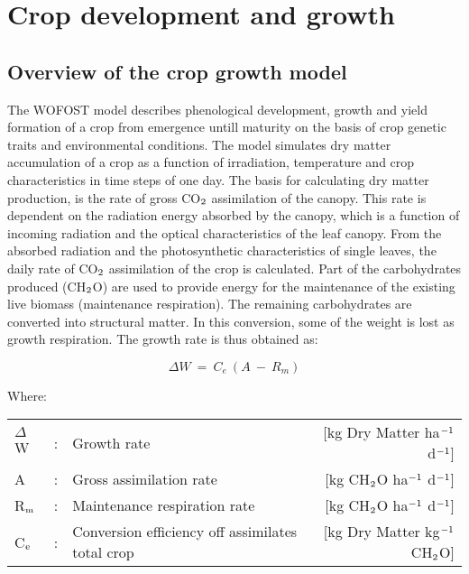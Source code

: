 \chapter{Crop development and growth}

\section{Overview of the crop growth model}

The WOFOST model describes phenological development, growth and yield formation of
a crop from emergence untill maturity on the basis of crop genetic traits and 
environmental conditions. The model simulates dry matter accumulation of a crop as a function
of irradiation, temperature and crop characteristics in time steps of one day. 
The basis for calculating dry matter production, is the rate of gross CO$_{{\rm 2}}$ assimilation of
the canopy. This rate is dependent on the radiation energy absorbed by the canopy, which
is a function of incoming radiation and the optical characteristics of the leaf canopy.
From the absorbed radiation and
the photosynthetic characteristics of single leaves, the daily rate of CO$_{{\rm 2}}$ assimilation of the
crop is calculated. Part of the carbohydrates produced (CH$_{{\rm 2}}$O) are used to provide energy
for the maintenance of the existing live biomass (maintenance respiration). The remaining
carbohydrates are converted into structural matter. In this conversion, some of the weight
is lost as growth respiration. The growth rate is thus obtained as:

\begin{equation}
\Delta W ~=~ C _{e} ~( A ~-~ R _{m} )
\end{equation}

Where:\\[5pt]
\begin{tabularx}{\textwidth}{llXr}
	$\Delta$W &:& Growth rate    &   
	[kg Dry Matter ha$^{{\rm -1}}$ d$^{{\rm -1}}$]\\
	A  &:& Gross assimilation   rate &  
	[kg CH$_{{\rm 2}}$O ha$^{{\rm -1}}$ d$^{{\rm -1}}$]\\
	R$_{{\rm m}}$  &:& Maintenance respiration rate    &  
	[kg CH$_{{\rm 2}}$O ha$^{{\rm -1}}$ d$^{{\rm -1}}$]\\
	C$_{{\rm e}}$ &:& Conversion efficiency off assimilates total crop   &   
	[kg Dry Matter kg$^{{\rm -1}}$ CH$_{{\rm 2}}$O]\\
\end{tabularx}

